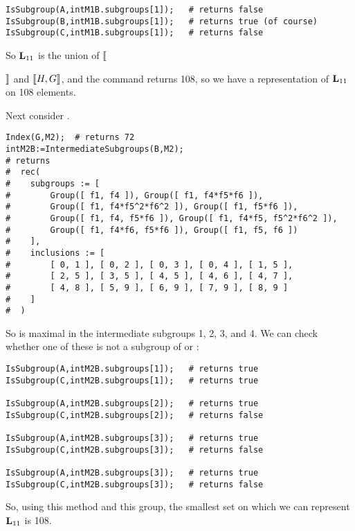 {\small 
\begin{verbatim}
IsSubgroup(A,intM1B.subgroups[1]);   # returns false
IsSubgroup(B,intM1B.subgroups[1]);   # returns true (of course)
IsSubgroup(C,intM1B.subgroups[1]);   # returns false
\end{verbatim}
}
So $\mathbf{L}_{11}$ is the union of $\llbracket${$\rrbracket$
and $\llbracket H, G \rrbracket$, and the command  returns 108,
so we have a representation of $\mathbf{L}_{11}$ on 108 elements.

Next consider .

{\small 
\begin{verbatim}
Index(G,M2);  # returns 72
intM2B:=IntermediateSubgroups(B,M2);
# returns 
#  rec( 
#    subgroups := [ 
#        Group([ f1, f4 ]), Group([ f1, f4*f5*f6 ]), 
#        Group([ f1, f4*f5^2*f6^2 ]), Group([ f1, f5*f6 ]), 
#        Group([ f1, f4, f5*f6 ]), Group([ f1, f4*f5, f5^2*f6^2 ]), 
#        Group([ f1, f4*f6, f5*f6 ]), Group([ f1, f5, f6 ]) 
#    ], 
#    inclusions := [ 
#        [ 0, 1 ], [ 0, 2 ], [ 0, 3 ], [ 0, 4 ], [ 1, 5 ], 
#        [ 2, 5 ], [ 3, 5 ], [ 4, 5 ], [ 4, 6 ], [ 4, 7 ], 
#        [ 4, 8 ], [ 5, 9 ], [ 6, 9 ], [ 7, 9 ], [ 8, 9 ] 
#    ] 
#  )
\end{verbatim}
}
So  is maximal in the intermediate subgroups 1, 2, 3, and 4.
We can check whether one of these is not a subgroup of  or :

{\small 
\begin{verbatim}
IsSubgroup(A,intM2B.subgroups[1]);   # returns true
IsSubgroup(C,intM2B.subgroups[1]);   # returns true

IsSubgroup(A,intM2B.subgroups[2]);   # returns true
IsSubgroup(C,intM2B.subgroups[2]);   # returns false

IsSubgroup(A,intM2B.subgroups[3]);   # returns true
IsSubgroup(C,intM2B.subgroups[3]);   # returns false

IsSubgroup(A,intM2B.subgroups[3]);   # returns true
IsSubgroup(C,intM2B.subgroups[3]);   # returns false
\end{verbatim}
}
So, using this method and this group, the smallest set on 
which we can represent $\mathbf{L}_{11}$ is 108.




}

